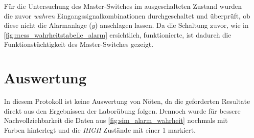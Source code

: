\documentclass[12pt,english,ngerman]{scrartcl}
\begin{document}
Für die Untersuchung des Master-Switches im ausgeschalteten Zustand wurden die
zuvor \textit{wahren} Eingangssignalkombinationen durchgeschaltet und überprüft, ob diese
nicht die Alarmanlage ($y$) anschlagen lassen. Da die Schaltung zuvor, wie in
\autoref{fig:mess_wahrheitstabelle_alarm} ersichtlich, funktionierte, ist
dadurch die Funktionstüchtigkeit des Master-Switches gezeigt.


\section{Auswertung}\label{sec:Auswertung}
In diesem Protokoll ist keine Auswertung von Nöten, da die geforderten Resultate
direkt aus den Ergebnissen der Laborübung folgen. Dennoch wurde für bessere 
Nachvollziehbarkeit die Daten aus \autoref{fig:sim_alarm_wahrheit} nochmals mit Farben
hinterlegt und die \textit{HIGH} Zustände mit einer 1 markiert. 
\end{document}
